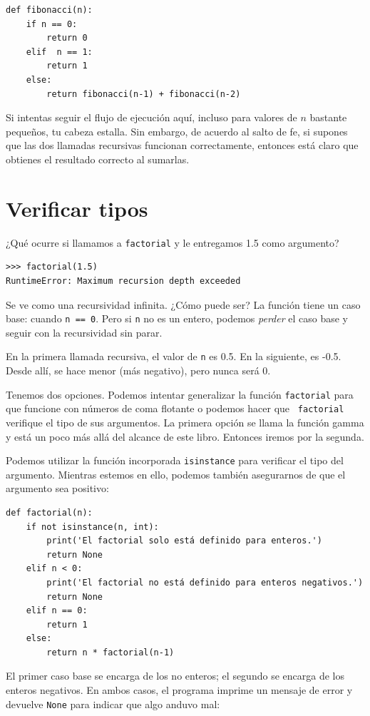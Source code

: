 \documentclass[10pt]{book}
\begin{document}
\begin{verbatim}
def fibonacci(n):
    if n == 0:
        return 0
    elif  n == 1:
        return 1
    else:
        return fibonacci(n-1) + fibonacci(n-2)
\end{verbatim}
%
Si intentas seguir el flujo de ejecución aquí, incluso para valores
de $n$ bastante pequeños, tu cabeza estalla.  Sin embargo, de acuerdo al
salto de fe, si supones que las dos llamadas recursivas
funcionan correctamente, entonces está claro que obtienes
el resultado correcto al sumarlas.


\section{Verificar tipos}
\label{guardian}

¿Qué ocurre si llamamos a {\tt factorial} y le entregamos 1.5 como argumento?

\begin{verbatim}
>>> factorial(1.5)
RuntimeError: Maximum recursion depth exceeded
\end{verbatim}
%
Se ve como una recursividad infinita.  ¿Cómo puede ser?  La función
tiene un caso base: cuando {\tt n == 0}.  Pero si {\tt n} no es un entero,
podemos {\em perder} el caso base y seguir con la recursividad sin parar.

En la primera llamada recursiva, el valor de {\tt n} es 0.5.
En la siguiente, es -0.5.  Desde allí, se hace menor
(más negativo), pero nunca será 0.

Tenemos dos opciones.  Podemos intentar generalizar la función {\tt factorial}
para que funcione con números de coma flotante o podemos hacer que {\tt
  factorial} verifique el tipo de sus argumentos.  La primera opción se
llama la función gamma y está
un poco más allá del alcance de este libro.  Entonces iremos por la segunda.

Podemos utilizar la función incorporada {\tt isinstance} para verificar el tipo
del argumento.  Mientras estemos en ello, podemos también asegurarnos de que el
argumento sea positivo:

\begin{verbatim}
def factorial(n):
    if not isinstance(n, int):
        print('El factorial solo está definido para enteros.')
        return None
    elif n < 0:
        print('El factorial no está definido para enteros negativos.')
        return None
    elif n == 0:
        return 1
    else:
        return n * factorial(n-1)
\end{verbatim}
%
El primer caso base se encarga de los no enteros; el
segundo se  encarga de los enteros negativos.  En ambos casos, el programa imprime
un mensaje de error y devuelve {\tt None} para indicar que algo
anduvo mal:
\end{document}

